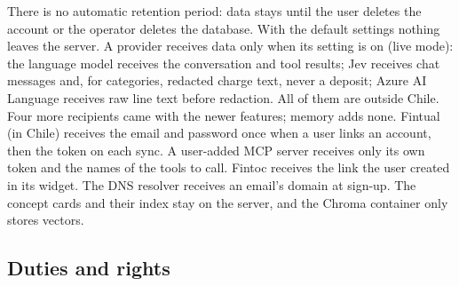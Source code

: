 There is no automatic retention period: data stays until the user deletes the account or the operator deletes the
database. With the default settings nothing leaves the server. A provider receives data only when its setting is on
(live mode): the language model receives the conversation and tool results; Jev receives chat messages and, for
categories, redacted charge text, never a deposit; Azure AI Language receives raw line text before redaction. All of them
are outside Chile. Four more recipients came with the newer features; memory adds none. Fintual (in Chile) receives the email and password
once when a user links an account, then the token on each sync. A user-added MCP server receives only its own token
and the names of the tools to call. Fintoc receives the link the user created in its widget. The DNS resolver receives
an email's domain at sign-up. The concept cards and their index stay on the server, and the Chroma container only
stores vectors.

\subsection{Duties and rights}

